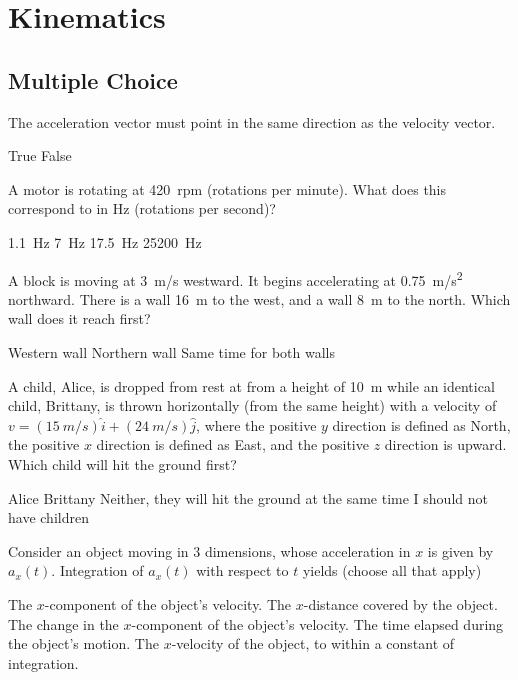 \section{Kinematics}

\subsection{Multiple Choice}

\question The acceleration vector must point in the same direction as the velocity vector.
\begin{checkboxes}
\choice True
\CorrectChoice False \correct
\end{checkboxes}

\question A motor is rotating at \SI{420}{rpm} (rotations per minute). What does this correspond to in \si{Hz} (rotations per second)?
\begin{checkboxes}
\choice \SI{1.1}{Hz}
\CorrectChoice \SI{7}{Hz} \correct
\choice \SI{17.5}{Hz}
\choice \SI{25200}{Hz}
\end{checkboxes}

\question A block is moving at \SI{3}{m/s} westward.  It begins accelerating at \SI{0.75}{m/s^2} northward.  There is a wall \SI{16}{m} to the west, and a wall \SI{8}{m} to the north.  Which wall does it reach first?
\begin{checkboxes}
\choice Western wall
\CorrectChoice Northern wall \correct
\choice Same time for both walls
\end{checkboxes}


\question A child, Alice, is dropped from rest at from a height of \SI{10}{m} while an identical child, Brittany, is thrown horizontally (from the same height) with a velocity of $v = (\SI{15}{m/s})\hat{i} + (\SI{24}{m/s})\hat{j}$, where the positive $y$ direction is defined as North, the positive $x$ direction is defined as East, and the positive $z$ direction is upward. Which child will hit the ground first?
\begin{checkboxes}
\choice Alice
\choice Brittany
\CorrectChoice Neither, they will hit the ground at the same time \correct
\choice I should not have children
\end{checkboxes}


\question Consider an object moving in 3 dimensions, whose acceleration in $x$ is given by $a_x (t)$. Integration of $a_x (t)$ with respect to $t$  yields (choose all that apply)
\begin{checkboxes}
\choice The $x$-component of the object's velocity.
\choice The $x$-distance covered by the object.
\CorrectChoice The change in the $x$-component of the \correct object's velocity.
\choice The time elapsed during the object's motion.
\CorrectChoice The $x$-velocity of the object, to within a constant of integration. \correct
\end{checkboxes}


